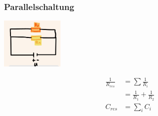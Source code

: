     \subsubsection*{Parallelschaltung}
    \vspace{-1mm}
    \begin{minipage}{0.49\linewidth}
        \begin{footnotesize}
            \begin{center}
                \vspace{2mm}
                \includegraphics[width = 30mm]{src/images/parallelschaltung.png}
            \end{center}
        \end{footnotesize}
    \end{minipage}
    \begin{minipage}{0.5\linewidth}
        \begin{scriptsize}
            \begin{center}
                \begin{align*}
                    \frac{1}{R_{res}} &= \sum \frac{1}{R_i}\\
                    &= \frac{1}{R_1} +\frac{1}{R_2}\\
                    C_{res} &= \sum\limits_i C_i
                \end{align*}
            \end{center}
        \end{scriptsize}
    \end{minipage}
    \vspace{1mm}  